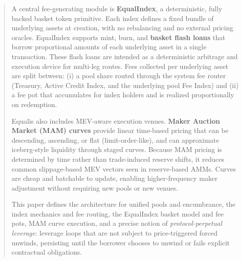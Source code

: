 \documentclass[version=preprint]{iacrcc}
\begin{document}
\begin{abstract}
A central fee-generating module is \textbf{EqualIndex}, a deterministic, fully backed basket token primitive. Each index defines a fixed bundle of underlying assets at creation, with no rebalancing and no external pricing oracles. EqualIndex supports mint, burn, and \textbf{basket flash loans} that borrow proportional amounts of each underlying asset in a single transaction. These flash loans are intended as a deterministic arbitrage and execution device for multi-leg routes. Fees collected per underlying asset are split between: (i) a pool share routed through the system fee router (Treasury, Active Credit Index, and the underlying pool Fee Index) and (ii) a fee pot that accumulates for index holders and is realized proportionally on redemption.

Equalis also includes MEV-aware execution venues. \textbf{Maker Auction Market (MAM) curves} provide linear time-based pricing that can be descending, ascending, or flat (limit-order-like), and can approximate iceberg-style liquidity through staged curves. Because MAM pricing is determined by time rather than trade-induced reserve shifts, it reduces common slippage-based MEV vectors seen in reserve-based AMMs. Curves are cheap and batchable to update, enabling higher-frequency maker adjustment without requiring new pools or new venues.

This paper defines the architecture for unified pools and encumbrance, the index mechanics and fee routing, the EqualIndex basket model and fee pots, MAM curve execution, and a precise notion of \textit{protocol-perpetual leverage}: leverage loops that are not subject to price-triggered forced unwinds, persisting until the borrower chooses to unwind or fails explicit contractual obligations.
\end{abstract}
\end{document}
